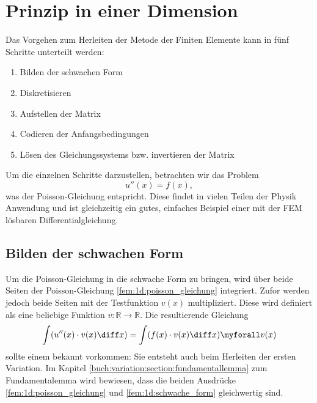 %
%
%
%
\section{Prinzip in einer Dimension\label{fem:prinzip_1d}}

Das Vorgehen zum Herleiten der Metode der Finiten Elemente kann in fünf Schritte unterteilt werden:
\begin{enumerate}
    \item Bilden der schwachen Form
    \item Diskretisieren
    \item Aufstellen der Matrix
    \item Codieren der Anfangsbedingungen
    \item Lösen des Gleichungssystems bzw. invertieren der Matrix
\end{enumerate}

Um die einzelnen Schritte darzustellen, betrachten wir das Problem
\begin{equation}
    u''(x) = f(x)
    \label{fem:1d:poisson_gleichung},
\end{equation}
was der Poisson-Gleichung entspricht. 
Diese findet in vielen Teilen der Physik Anwendung und ist gleichzeitig ein gutes, einfaches Beispiel einer mit der FEM lösbaren Differentialgleichung.


\subsection{Bilden der schwachen Form}
Um die Poisson-Gleichung in die schwache Form zu bringen, wird über beide Seiten der Poisson-Gleichung \ref{fem:1d:poisson_gleichung} integriert.
Zufor werden jedoch beide Seiten mit der Testfunktion $ v(x) $ multipliziert. %
Diese wird definiert als eine beliebige Funktion $ v \colon \mathbb{R} \rightarrow \mathbb{R} $.
Die resultierende Gleichung
\begin{equation}
    \int(u''(x) \cdot v(x) \diff x) = \int(f(x) \cdot v(x) \diff x) \myforall v(x)
    \label{fem:1d:schwache_form}
\end{equation}
sollte einem bekannt vorkommen: Sie entsteht auch beim Herleiten der ersten Variation.
Im Kapitel \ref{buch:variation:section:fundamentallemma} zum Fundamentalemma wird bewiesen, dass die beiden Ausdrücke \ref{fem:1d:poisson_gleichung} und \ref{fem:1d:schwache_form} gleichwertig sind.

